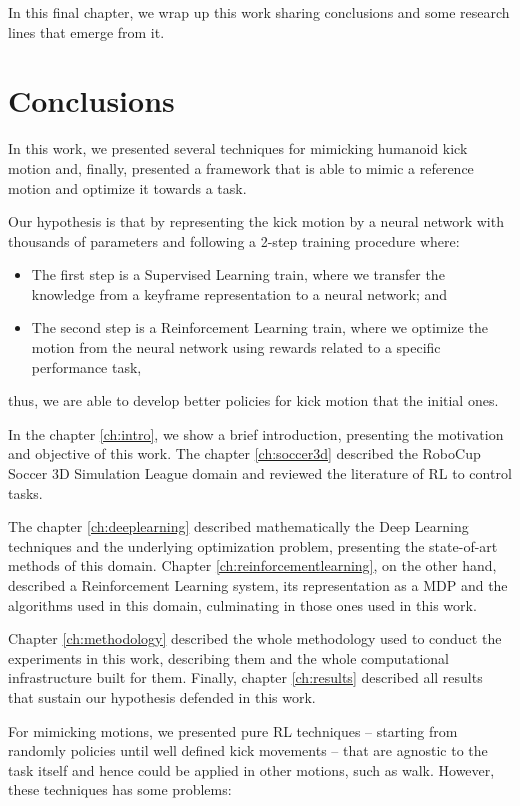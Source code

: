 In this final chapter, we wrap up this work sharing conclusions and some research lines that emerge from it. 

\section{Conclusions}
In this work, we presented several techniques for mimicking humanoid kick motion and, finally, presented a framework that is able to mimic a reference motion and optimize it towards a task.

Our hypothesis is that by representing the kick motion by a neural network with thousands of parameters and following a 2-step training procedure where:

\begin{itemize}
	\item The first step is a Supervised Learning train, where we transfer the knowledge from a keyframe representation to a neural network; and
	\item The second step is a Reinforcement Learning train, where we optimize the motion from the neural network using rewards related to a specific performance task,
\end{itemize}
thus, we are able to develop better policies for kick motion that the initial ones.

In the chapter \ref{ch:intro}, we show a brief introduction, presenting the motivation and objective of this work. The chapter \ref{ch:soccer3d} described the RoboCup Soccer 3D Simulation League domain and reviewed the literature of RL to control tasks.

The chapter \ref{ch:deeplearning} described mathematically the Deep Learning techniques and the underlying optimization problem, presenting the state-of-art methods of this domain. Chapter \ref{ch:reinforcementlearning}, on the other hand, described a Reinforcement Learning system, its representation as a MDP and the algorithms used in this domain, culminating in those ones used in this work.

Chapter \ref{ch:methodology} described the whole methodology used to conduct the experiments in this work, describing them and the whole computational infrastructure built for them. Finally, chapter \ref{ch:results} described all results that sustain our hypothesis defended in this work.

For mimicking motions, we presented pure RL techniques -- starting from randomly policies until well defined kick movements -- that are agnostic to the task itself and hence could be applied in other motions, such as walk. However, these techniques has some problems:

